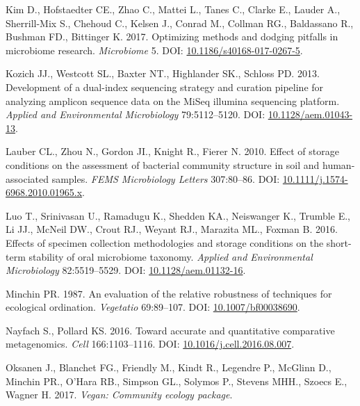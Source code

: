 \documentclass[12pt,]{article}
\begin{document}
\hypertarget{ref-review_Kim_2017}{}
Kim D., Hofstaedter CE., Zhao C., Mattei L., Tanes C., Clarke E., Lauder
A., Sherrill-Mix S., Chehoud C., Kelsen J., Conrad M., Collman RG.,
Baldassano R., Bushman FD., Bittinger K. 2017. Optimizing methods and
dodging pitfalls in microbiome research. \emph{Microbiome} 5. DOI:
\href{https://doi.org/10.1186/s40168-017-0267-5}{10.1186/s40168-017-0267-5}.

\hypertarget{ref-protocol_Kozich_2013}{}
Kozich JJ., Westcott SL., Baxter NT., Highlander SK., Schloss PD. 2013.
Development of a dual-index sequencing strategy and curation pipeline
for analyzing amplicon sequence data on the MiSeq illumina sequencing
platform. \emph{Applied and Environmental Microbiology} 79:5112--5120.
DOI: \href{https://doi.org/10.1128/aem.01043-13}{10.1128/aem.01043-13}.

\hypertarget{ref-storage_Lauber_2010}{}
Lauber CL., Zhou N., Gordon JI., Knight R., Fierer N. 2010. Effect of
storage conditions on the assessment of bacterial community structure in
soil and human-associated samples. \emph{FEMS Microbiology Letters}
307:80--86. DOI:
\href{https://doi.org/10.1111/j.1574-6968.2010.01965.x}{10.1111/j.1574-6968.2010.01965.x}.

\hypertarget{ref-preservation_Luo_2016}{}
Luo T., Srinivasan U., Ramadugu K., Shedden KA., Neiswanger K., Trumble
E., Li JJ., McNeil DW., Crout RJ., Weyant RJ., Marazita ML., Foxman B.
2016. Effects of specimen collection methodologies and storage
conditions on the short-term stability of oral microbiome taxonomy.
\emph{Applied and Environmental Microbiology} 82:5519--5529. DOI:
\href{https://doi.org/10.1128/aem.01132-16}{10.1128/aem.01132-16}.

\hypertarget{ref-bc_index_Minchin1987}{}
Minchin PR. 1987. An evaluation of the relative robustness of techniques
for ecological ordination. \emph{Vegetatio} 69:89--107. DOI:
\href{https://doi.org/10.1007/bf00038690}{10.1007/bf00038690}.

\hypertarget{ref-metagenomcis_bias_Nayfach_2016}{}
Nayfach S., Pollard KS. 2016. Toward accurate and quantitative
comparative metagenomics. \emph{Cell} 166:1103--1116. DOI:
\href{https://doi.org/10.1016/j.cell.2016.08.007}{10.1016/j.cell.2016.08.007}.

\hypertarget{ref-vegan_citation}{}
Oksanen J., Blanchet FG., Friendly M., Kindt R., Legendre P., McGlinn
D., Minchin PR., O'Hara RB., Simpson GL., Solymos P., Stevens MHH.,
Szoecs E., Wagner H. 2017. \emph{Vegan: Community ecology package}.
\end{document}
